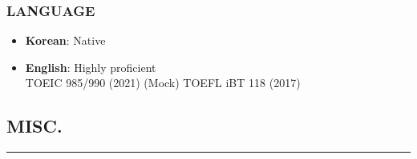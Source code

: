 \documentclass[10pt,a4]{article}
\begin{document}
\begin{small}
\subsubsection*{LANGUAGE}

\begin{itemize}{}{}
	\item \textbf{Korean}: Native
	\item \textbf{English}: Highly proficient  \\ %
	TOEIC 985/990 (2021)
	(Mock) TOEFL iBT 118 (2017) \\
	
\end{itemize}

\vspace{0.1cm}

%
%
%
%
%
%
%
%
%


\subsection*{MISC.}
\hrule
\vspace{0.2cm}


\end{small}
\end{document}
